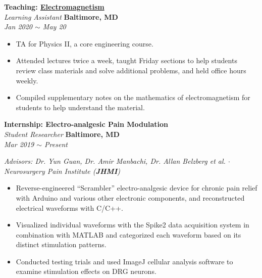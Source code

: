 \documentclass[10pt, letterpaper]{article}
\begin{document}
\begin{paracol}{2}
	\textbf{Teaching: \href{https://github.com/chenyi00/physics-2}{Electromagnetism}}\\
	\textit{Learning Assistant}
	\switchcolumn
	\raggedleft\textbf{Baltimore, MD}\\
	\raggedleft\textit{Jan 2020 $\sim$ May 20}
\end{paracol}\vspace{-1mm}
\vspace{-2mm}
\begin{itemize}
	\item TA for Physics II, a core engineering course. \vspace{-3mm}
	\item Attended lectures twice a week, taught Friday sections to help students review class materials and solve additional problems, and held office hours weekly.
	\vspace{-3mm}
	\item Compiled supplementary notes on the mathematics of electromagnetism for students to help understand the material.
\end{itemize}
\vspace{-2mm}


\begin{paracol}{2}
	\textbf{Internship: Electro-analgesic Pain Modulation}\\
	\textit{Student Researcher}
	\switchcolumn \hfill
	\raggedleft\textbf{Baltimore, MD}\\
	\raggedleft\textit{Mar 2019 $\sim$ Present}
\end{paracol}\vspace{-1mm}
\textit{Advisors: Dr. Yun Guan, Dr. Amir Manbachi, Dr. Allan Belzberg et al. $\cdot$ Neurosurgery
Pain Institute (\textbf{JHMI})}
\vspace{-3mm}
\begin{itemize}
	\item Reverse-engineered ``Scrambler'' electro-analgesic device for chronic pain relief with 
	Arduino and various other electronic components, and reconstructed electrical waveforms 
	with C/C++.
	\vspace{-3mm}
	\item Visualized individual waveforms with the Spike2 data acquisition system in combination 
	with MATLAB and categorized each waveform based on its distinct stimulation patterns.
	\vspace{-3mm}
	\item Conducted testing trials and used ImageJ cellular analysis software to examine stimulation effects on DRG neurons.
\end{itemize}
\vspace{-2mm} 
\end{document}
